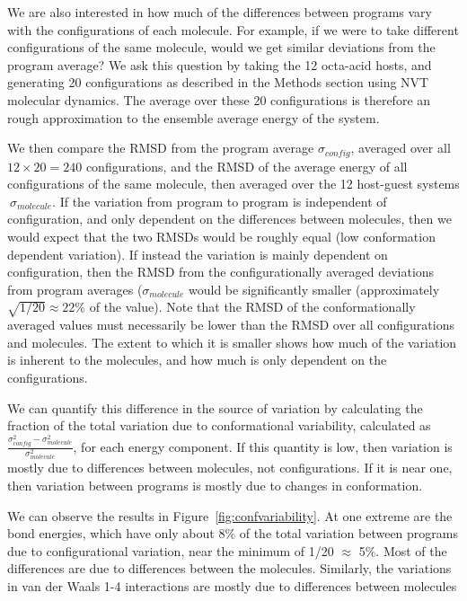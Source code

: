 We are also interested in how much of the differences between programs
vary with the configurations of each molecule. For example, if we were
to take different configurations of the same molecule, would we get
similar deviations from the program average?  We ask this question by
taking the 12 octa-acid hosts, and generating 20 configurations as
described in the Methods section using NVT molecular dynamics. The
average over these 20 configurations is therefore an rough
approximation to the ensemble average energy of the system. 

We then compare the RMSD from the program average $\sigma_{config}$,
averaged over all $12 \times 20 = 240$ configurations, and the RMSD of
the average energy of all configurations of the same molecule, then
averaged over the 12 host-guest systems$~\sigma_{molecule}$. If the
variation from program to program is independent of configuration, and
only dependent on the differences between molecules, then we would
expect that the two RMSDs would be roughly equal (low conformation
dependent variation).  If instead the variation is mainly dependent on
configuration, then the RMSD from the configurationally averaged
deviations from program averages ($\sigma_{molecule}$ would be
significantly smaller (approximately $\sqrt{1/20} \approx 22$\% of the
value). Note that the RMSD of the conformationally averaged values
must necessarily be lower than the RMSD over all configurations and
molecules. The extent to which it is smaller shows how much of the
variation is inherent to the molecules, and how much is only dependent
on the configurations.

We can quantify this difference in the source of variation by
calculating the fraction of the total variation due to conformational
variability, calculated as
$\frac{\sigma^2_{config}-\sigma^2_{molecule}}{\sigma^2_{molecule}}$,
for each energy component. If this quantity is low, then variation is
mostly due to differences between molecules, not configurations.  If
it is near one, then variation between programs is mostly due to
changes in conformation.

We can observe the results in Figure~\ref{fig:confvariability}. At one
extreme are the bond energies, which have only about 8\% of the total
variation between programs due to configurational variation, near the
minimum of 1/20 $\approx$ 5\%. Most of the differences are due to
differences between the molecules.  Similarly, the variations in van
der Waals 1-4 interactions are mostly due to differences between
molecules

